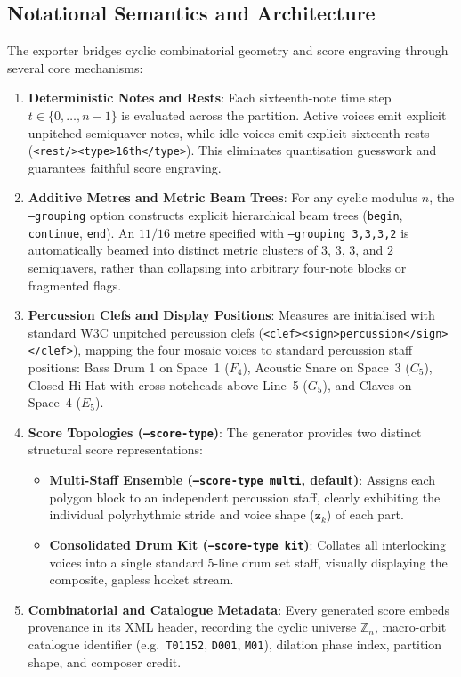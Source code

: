 \subsection{Notational Semantics and Architecture}

The exporter bridges cyclic combinatorial geometry and score engraving through several core mechanisms:
\begin{enumerate}
    \item \textbf{Deterministic Notes and Rests}:
    Each sixteenth-note time step $t \in \{0, \dots, n-1\}$ is evaluated across the partition. Active voices emit explicit unpitched semiquaver notes, while idle voices emit explicit sixteenth rests (\texttt{<rest/><type>16th</type>}). This eliminates quantisation guesswork and guarantees faithful score engraving.

    \item \textbf{Additive Metres and Metric Beam Trees}:
    For any cyclic modulus $n$, the \texttt{--grouping} option constructs explicit hierarchical beam trees (\texttt{begin}, \texttt{continue}, \texttt{end}). An $11/16$ metre specified with \texttt{--grouping 3,3,3,2} is automatically beamed into distinct metric clusters of $3$, $3$, $3$, and $2$ semiquavers, rather than collapsing into arbitrary four-note blocks or fragmented flags.

    \item \textbf{Percussion Clefs and Display Positions}:
    Measures are initialised with standard W3C unpitched percussion clefs (\texttt{<clef><sign>percussion</sign></clef>}), mapping the four mosaic voices to standard percussion staff positions: Bass Drum 1 on Space~1 ($F_4$), Acoustic Snare on Space~3 ($C_5$), Closed Hi-Hat with cross noteheads above Line~5 ($G_5$), and Claves on Space~4 ($E_5$).

    \item \textbf{Score Topologies (\texttt{--score-type})}:
    The generator provides two distinct structural score representations:
    \begin{itemize}
        \item \textbf{Multi-Staff Ensemble (\texttt{--score-type multi}, default)}: Assigns each polygon block to an independent percussion staff, clearly exhibiting the individual polyrhythmic stride and voice shape ($\mathbf{z}_k$) of each part.
        \item \textbf{Consolidated Drum Kit (\texttt{--score-type kit})}: Collates all interlocking voices into a single standard 5-line drum set staff, visually displaying the composite, gapless hocket stream.
    \end{itemize}

    \item \textbf{Combinatorial and Catalogue Metadata}:
    Every generated score embeds provenance in its XML header, recording the cyclic universe $\mathbb{Z}_n$, macro-orbit catalogue identifier (e.g.\ \texttt{T01152}, \texttt{D001}, \texttt{M01}), dilation phase index, partition shape, and composer credit.
\end{enumerate}

